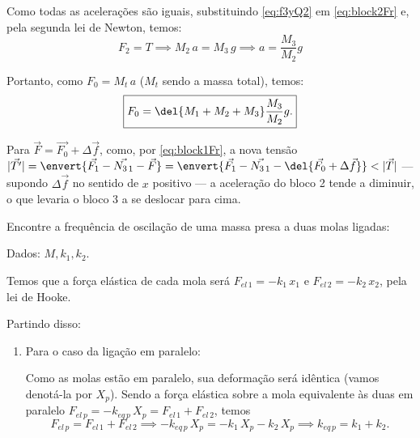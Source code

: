 \documentclass[]{IMTexam}
\begin{document}
\begin{questions}
\begin{solution}
		Como todas as acelerações são iguais, substituindo \ref{eq:f3yQ2} em \ref{eq:block2Fr} e, pela segunda lei de Newton, temos:
		\begin{equation}\label{eq:accVQ2}
			F_{2}=T\implies M_2\,a=M_3\,g\implies a=\dfrac{M_3}{M_2}g
		\end{equation}

		Portanto, como $ F_0=M_t\,a $ ($ M_t $ sendo a massa total), temos:
		\[ \boxed{F_0=\del{M_1+M_2+M_3}\dfrac{M_3}{M_2}g.} \]

		Para $ \vec{F}=\vec{F_0}+\Delta\vec{f} $, como, por \ref{eq:block1Fr}, a nova tensão $ |\vec{T'}|=\envert{\vec{F_1}-\vec{N_{3\,1}}-\vec{F}}=\envert{\vec{F_1}-\vec{N_{3\,1}}-\del{\vec{F_0}+\Delta\vec{f}}}<|\vec{T}| $ --- supondo $ \Delta\vec{f} $ no sentido de $ x $ positivo --- a aceleração do bloco 2 tende a diminuir, o que levaria o bloco 3 a se deslocar para cima.
	\end{solution}



	\question Encontre a frequência de oscilação de uma massa presa a duas molas
	ligadas:


	Dados: $ M, k_1, k_2 $.

	\clearpage

	\begin{solution}
		Temos que a força elástica de cada mola será $ F_{el\,1}=-k_1\,x_1 $ e $ F_{el\,2}=-k_2\,x_2 $, pela lei de Hooke.

		Partindo disso:
		\begin{enumerate}[label=(\alph*)]
			\item Para o caso da ligação em paralelo:

			      Como as molas estão em paralelo, sua deformação será idêntica (vamos denotá-la por $ X_p $). Sendo a força elástica sobre a mola equivalente às duas em paralelo $ F_{el\,p}=-k_{eq\,p}\,X_p=F_{el\,1}+F_{el\,2} $, temos
			      \[ F_{el\,p}=F_{el\,1}+F_{el\,2}\implies -k_{eq\,p}\,X_p=-k_1\,X_p-k_2\,X_p\implies k_{eq\,p}=k_1+k_2. \]


\end{enumerate}
\end{solution}
\end{questions}
\end{document}
